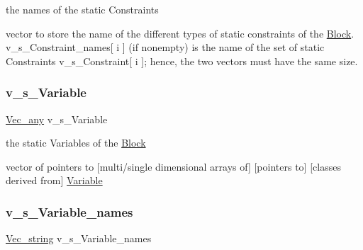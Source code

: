 the names of the static Constraints 

vector to store the name of the different types of static constraints of the \mbox{\hyperlink{class_s_m_spp__di__unipi__it_1_1_block}{Block}}. v\+\_\+s\+\_\+\+Constraint\+\_\+names\mbox{[} i \mbox{]} (if nonempty) is the name of the set of static Constraints v\+\_\+s\+\_\+\+Constraint\mbox{[} i \mbox{]}; hence, the two vectors must have the same size. \mbox{\label{class_s_m_spp__di__unipi__it_1_1_block_a65a70f0d99265a81cd6ccbf35cf80d96}} 
\subsubsection{\texorpdfstring{v\+\_\+s\+\_\+\+Variable}{v\_s\_Variable}}
{\footnotesize\ttfamily \mbox{\hyperlink{group___s_m_s__types_ga58ded0963812566c064a5177b2f84c28}{Vec\+\_\+any}} v\+\_\+s\+\_\+\+Variable\hspace{0.3cm}{\ttfamily [private]}}



the static Variables of the \mbox{\hyperlink{class_s_m_spp__di__unipi__it_1_1_block}{Block}} 

vector of pointers to \mbox{[}multi/single dimensional arrays of\mbox{]} \mbox{[}pointers to\mbox{]} \mbox{[}classes derived from\mbox{]} \mbox{\hyperlink{class_s_m_spp__di__unipi__it_1_1_variable}{Variable}} \mbox{\label{class_s_m_spp__di__unipi__it_1_1_block_a3859b93e6fd6602243c5640a3ec4597b}} 
\subsubsection{\texorpdfstring{v\+\_\+s\+\_\+\+Variable\+\_\+names}{v\_s\_Variable\_names}}
{\footnotesize\ttfamily \mbox{\hyperlink{group___s_m_s__types_ga36068d46bc6e7ba661efe0093c7a8beb}{Vec\+\_\+string}} v\+\_\+s\+\_\+\+Variable\+\_\+names\hspace{0.3cm}{\ttfamily [protected]}}



